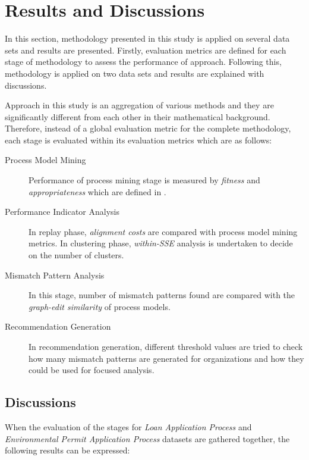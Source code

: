 \section{Results and Discussions}
\label{sec:results-and-discussions}

In this section, methodology presented in this study is applied on several data sets and results are presented. Firstly, evaluation metrics are defined for each stage of methodology to assess the performance of approach. Following this, methodology is applied on two data sets and results are explained with discussions.

Approach in this study is an aggregation of various methods and they are significantly different from each other in their mathematical background. Therefore, instead of a global evaluation metric for the complete methodology, each stage is evaluated within its evaluation metrics which are as follows:
\begin{description}
	\item[Process Model Mining] Performance of process mining stage is measured by \textit{fitness} and \textit{appropriateness} which are defined in \cite{rozinat2008conformance}.
	\item[Performance Indicator Analysis] In replay phase, \textit{alignment costs} \cite{van2012replaying} are compared with process model mining metrics. In clustering phase, \textit{within-SSE} analysis is undertaken to decide on the number of clusters.
	\item[Mismatch Pattern Analysis] In this stage, number of mismatch patterns found are compared with the \textit{graph-edit similarity} \cite{dijkman2011similarity} of process models.
	\item[Recommendation Generation] In recommendation generation, different threshold values are tried to check how many mismatch patterns are generated for organizations and how they could be used for focused analysis.
\end{description}




\subsection{Discussions}
\label{subsec:discussions}
When the evaluation of the stages for \textit{Loan Application Process} and \textit{Environmental Permit Application Process} datasets are gathered together, the following results can be expressed:

